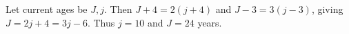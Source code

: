 Let current ages be $J,j$. Then $J+4=2(j+4)$ and $J-3=3(j-3)$, giving $J=2j+4=3j-6$. Thus $j=10$ and $\boxed{J=24}$ years.

